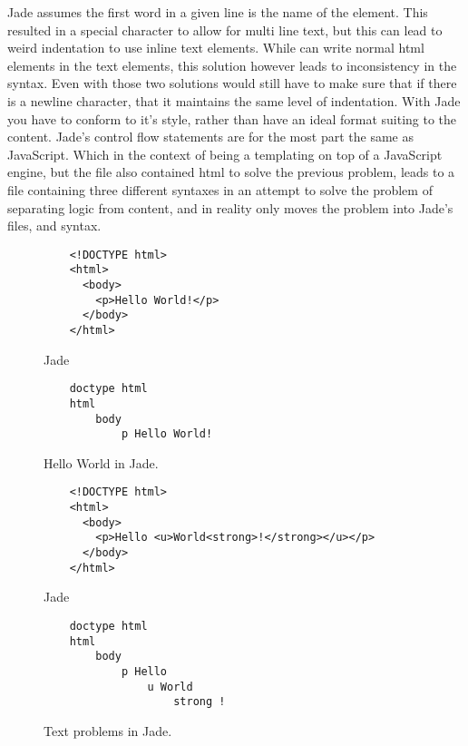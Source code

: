 Jade assumes the first word in a given line is the name of the element. This resulted in a special character to allow for multi line text, but this can lead to weird indentation to use inline text elements. While \you{} can write normal html elements in the text elements, this solution however leads to inconsistency in the syntax. Even with those two solutions \you{} would still have to make sure that if there is a newline character, that it maintains the same level of indentation. With Jade you have to conform to it's style, rather than have an ideal format suiting to the content. Jade's control flow statements are for the most part the same as JavaScript. Which in the context of being a templating on top of a JavaScript engine, but the file also contained html to solve the previous problem, leads to a file containing three different syntaxes in an attempt to solve the problem of separating logic from content, and in reality only moves the problem into Jade's files, and syntax.

\begin{figure}[ht!]
    \large{}\normalsize{}
    \begin{verbatim}
    <!DOCTYPE html>
    <html>
      <body>
        <p>Hello World!</p>
      </body>
    </html>
    \end{verbatim}
    \large{Jade}\normalsize{}
    \begin{verbatim}
    doctype html
    html
        body
            p Hello World!
    \end{verbatim}
    \caption{Hello World in Jade.}
    \label{fig:JadeHelloWorld}
\end{figure}

\begin{figure}[ht!]
    \large{}\normalsize{}
    \begin{verbatim}
    <!DOCTYPE html>
    <html>
      <body>
        <p>Hello <u>World<strong>!</strong></u></p>
      </body>
    </html>
    \end{verbatim}
    \large{Jade}\normalsize{}
    \begin{verbatim}
    doctype html
    html
        body
            p Hello
                u World
                    strong !
    \end{verbatim}
    \caption{Text problems in Jade.}
    \label{fig:JadeProblem}
\end{figure}


